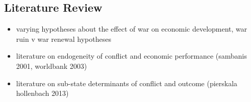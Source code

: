 \subsection{Literature Review}
\label{lit}

\begin{itemize}
	\item varying hypotheses about the effect of war on economic development, war ruin v war renewal hypotheses
	\item literature on endogeneity of conflict and economic performance (sambanis 2001, worldbank 2003)
	\item literature on sub-state determinants of conflict and outcome (pierskala hollenbach 2013)
\end{itemize}